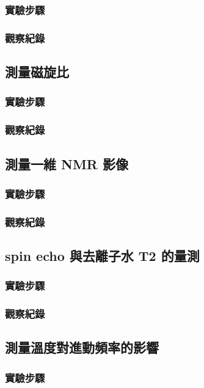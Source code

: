 \documentclass[twocolumn]{article}
\begin{document}
\subsubsection*{實驗步驟}
\subsubsection*{觀察紀錄}

\subsection{測量磁旋比}
\subsubsection*{實驗步驟}
\subsubsection*{觀察紀錄}

\subsection{測量一維 NMR 影像}
\subsubsection*{實驗步驟}
\subsubsection*{觀察紀錄}

\subsection{spin echo 與去離子水 T2 的量測}
\subsubsection*{實驗步驟}
\subsubsection*{觀察紀錄}

\subsection{測量溫度對進動頻率的影響}
\subsubsection*{實驗步驟}
\end{document}
